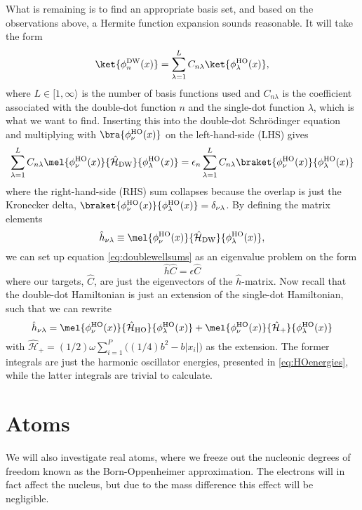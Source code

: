 What is remaining is to find an appropriate basis set, and based on the observations above, a Hermite function expansion sounds reasonable. It will take the form
\begin{equation}
\ket{\phi_n^{\text{DW}}(x)}=\sum_{\lambda=1}^{L}C_{n\lambda}\ket{\phi_{\lambda}^{\text{HO}}(x)},
\end{equation}
where $L\in[1,\infty\rangle$ is the number of basis functions used and $C_{n\lambda}$ is the coefficient associated with the double-dot function $n$ and the single-dot function $\lambda$, which is what we want to find. Inserting this into the double-dot Schrödinger equation and multiplying with $\bra{\phi_{\nu}^{\text{HO}}(x)}$ on the left-hand-side (LHS) gives
\begin{equation}
\label{eq:doublewellsums}
\sum_{\lambda=1}^LC_{n\lambda}\mel{\phi_{\nu}^{\text{HO}}(x)}{\hat{\mathcal{H}}_{\text{DW}}}{\phi_{\lambda}^{\text{HO}}(x)}=\epsilon_n\sum_{\lambda=1}^LC_{n\lambda}\braket{\phi_{\nu}^{\text{HO}}(x)}{\phi_{\lambda}^{\text{HO}}(x)}
\end{equation}
where the right-hand-side (RHS) sum collapses because the overlap is just the Kronecker delta, $\braket{\phi_{\nu}^{\text{HO}}(x)}{\phi_{\lambda}^{\text{HO}}(x)}=\delta_{\nu\lambda}$. By defining the matrix elements
\begin{equation}
\hat{h}_{\nu\lambda}\equiv\mel{\phi_{\nu}^{\text{HO}}(x)}{\hat{\mathcal{H}}_{\text{DW}}}{\phi_{\lambda}^{\text{HO}}(x)},
\end{equation}
we can set up equation \eqref{eq:doublewellsums} as an eigenvalue problem on the form
\begin{equation}
\hat{h}\hat{C}=\epsilon\hat{C}
\end{equation}
where our targets, $\hat{C}$, are just the eigenvectors of the $\hat{h}$-matrix. Now recall that the double-dot Hamiltonian is just an extension of the single-dot Hamiltonian, such that we can rewrite
\begin{equation}
\hat{h}_{\nu\lambda}=\mel{\phi_{\nu}^{\text{HO}}(x)}{\hat{\mathcal{H}}_{\text{HO}}}{\phi_{\lambda}^{\text{HO}}(x)}+\mel{\phi_{\nu}^{\text{HO}}(x)}{\hat{\mathcal{H}}_{\text{+}}}{\phi_{\lambda}^{\text{HO}}(x)}
\end{equation}
with $\hat{\mathcal{H}}_{\text{+}}=(1/2)\omega\sum_{i=1}^P\Big((1/4)b^2-b|x_i|\Big)$ as the extension. The former integrals are just the harmonic oscillator energies, presented in \eqref{eq:HOenergies}, while the latter integrals are trivial to calculate.

\section{Atoms} \label{sec:atomic}
We will also investigate real atoms, where we freeze out the nucleonic degrees of freedom known as the Born-Oppenheimer approximation. The electrons will in fact affect the nucleus, but due to the mass difference this effect will be negligible.

